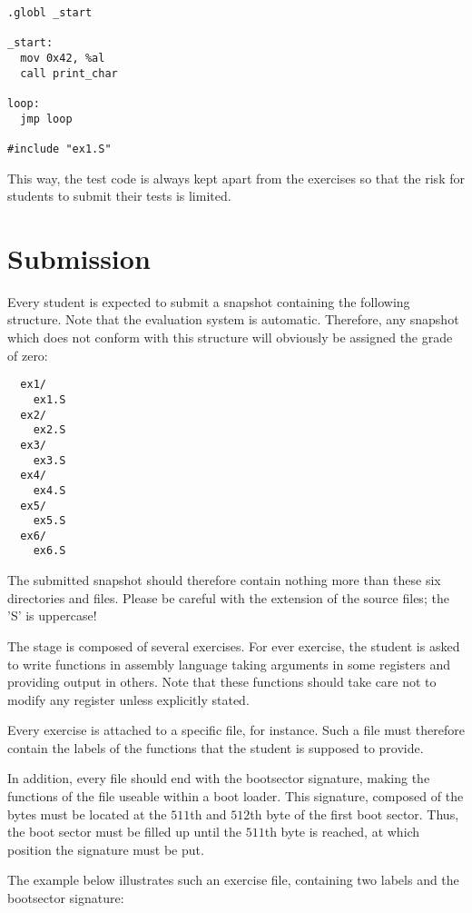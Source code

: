 \begin{verbatim}
.globl _start

_start:
  mov 0x42, %al
  call print_char

loop:
  jmp loop

#include "ex1.S"
\end{verbatim}

This way, the test code is always kept apart from the exercises so that
the risk for students to submit their tests is limited.

%
%

\section{Submission}

Every student is expected to submit a snapshot containing the following
structure. Note that the evaluation system is automatic. Therefore, any
snapshot which does not conform with this structure will obviously be assigned
the grade of zero:

\begin{verbatim}
  ex1/
    ex1.S
  ex2/
    ex2.S
  ex3/
    ex3.S
  ex4/
    ex4.S
  ex5/
    ex5.S
  ex6/
    ex6.S
\end{verbatim}

The submitted snapshot should therefore contain nothing more than these
six directories and files. Please be careful with the extension of the source
files; the 'S' is uppercase!

The  stage is composed of several exercises. For ever exercise,
the student is asked to write functions in assembly language taking arguments
in some registers and providing output in others. Note that these functions
should take care not to modify any register unless explicitly stated.

Every exercise is attached to a specific file,  for instance.
Such a file must therefore contain the labels of the functions that the student
is supposed to provide.

In addition, every file should end with the bootsector signature, making the
functions of the file useable within a boot loader. This signature, composed
of the bytes  must be located at the $511$th and $512$th byte
of the first boot sector. Thus, the boot sector must be filled up until the
$511$th byte is reached, at which position the signature must be put.

The example below illustrates such an exercise file, containing two
labels and the bootsector signature:

